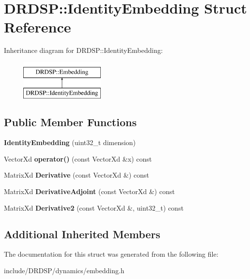 \hypertarget{struct_d_r_d_s_p_1_1_identity_embedding}{\section{D\-R\-D\-S\-P\-:\-:Identity\-Embedding Struct Reference}
\label{struct_d_r_d_s_p_1_1_identity_embedding}
}
Inheritance diagram for D\-R\-D\-S\-P\-:\-:Identity\-Embedding\-:\begin{figure}[H]
\begin{center}
\leavevmode
\includegraphics[height=2.000000cm]{struct_d_r_d_s_p_1_1_identity_embedding}
\end{center}
\end{figure}
\subsection*{Public Member Functions}
\begin{DoxyCompactItemize}
\item 
\hypertarget{struct_d_r_d_s_p_1_1_identity_embedding_aa00cf0923e554655559da42a9340ca1d}{{\bfseries Identity\-Embedding} (uint32\-\_\-t dimension)}\label{struct_d_r_d_s_p_1_1_identity_embedding_aa00cf0923e554655559da42a9340ca1d}

\item 
\hypertarget{struct_d_r_d_s_p_1_1_identity_embedding_aaed08501ed449445888d8e8776c69f4f}{Vector\-Xd {\bfseries operator()} (const Vector\-Xd \&x) const }\label{struct_d_r_d_s_p_1_1_identity_embedding_aaed08501ed449445888d8e8776c69f4f}

\item 
\hypertarget{struct_d_r_d_s_p_1_1_identity_embedding_a41bad0cd08f274f78412a31e0fb6854e}{Matrix\-Xd {\bfseries Derivative} (const Vector\-Xd \&) const }\label{struct_d_r_d_s_p_1_1_identity_embedding_a41bad0cd08f274f78412a31e0fb6854e}

\item 
\hypertarget{struct_d_r_d_s_p_1_1_identity_embedding_a836b4855538770d5f2d40e2c294c5b88}{Matrix\-Xd {\bfseries Derivative\-Adjoint} (const Vector\-Xd \&) const }\label{struct_d_r_d_s_p_1_1_identity_embedding_a836b4855538770d5f2d40e2c294c5b88}

\item 
\hypertarget{struct_d_r_d_s_p_1_1_identity_embedding_a62a97e69aa9aa28c5d4f3dc60cb5359e}{Matrix\-Xd {\bfseries Derivative2} (const Vector\-Xd \&, uint32\-\_\-t) const }\label{struct_d_r_d_s_p_1_1_identity_embedding_a62a97e69aa9aa28c5d4f3dc60cb5359e}

\end{DoxyCompactItemize}
\subsection*{Additional Inherited Members}


The documentation for this struct was generated from the following file\-:\begin{DoxyCompactItemize}
\item 
include/\-D\-R\-D\-S\-P/dynamics/embedding.\-h\end{DoxyCompactItemize}
